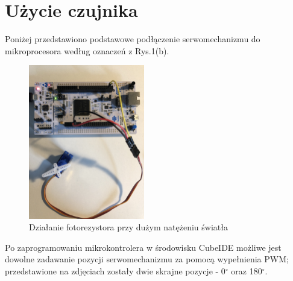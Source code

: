 \documentclass[11pt, a4paper]{article}
\begin{document}
\newpage
\section*{Użycie czujnika}
Poniżej przedstawiono podstawowe podłączenie serwomechanizmu do mikroprocesora według oznaczeń z Rys.1(b).
\vspace{0.5cm}
\begin{figure}[h!]
    \centering
    \includegraphics[width=0.45\textwidth,angle=90,origin=c]{fig/Serwo/polaczenie_modulu/podlaczenie.jpg}
    \caption{Działanie fotorezystora przy dużym natężeniu światła}
    \label{fig:my_label}
\end{figure}

Po zaprogramowaniu mikrokontrolera w środowisku CubeIDE możliwe jest dowolne zadawanie pozycji serwomechanizmu za pomocą wypełnienia PWM; przedstawione na zdjęciach zostały dwie skrajne pozycje - 0$^{\circ}$ oraz 180$^{\circ}$.
\end{document}
